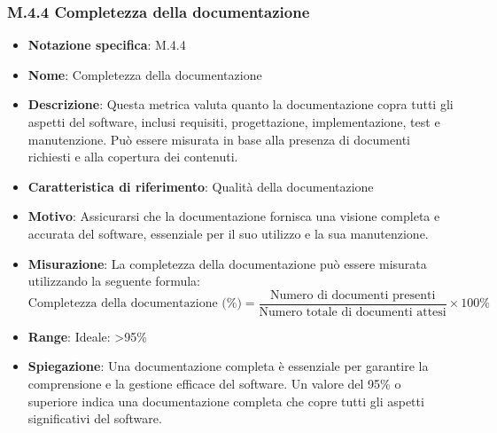 \subsubsection{M.4.4 Completezza della documentazione}
\begin{itemize}
    \item \textbf{Notazione specifica}: M.4.4
    \item \textbf{Nome}: Completezza della documentazione
    \item \textbf{Descrizione}: Questa metrica valuta quanto la documentazione copra tutti gli aspetti del software, inclusi requisiti, progettazione, implementazione, test e manutenzione. Può essere misurata in base alla presenza di documenti richiesti e alla copertura dei contenuti.
    \item \textbf{Caratteristica di riferimento}: Qualità della documentazione
    \item \textbf{Motivo}: Assicurarsi che la documentazione fornisca una visione completa e accurata del software, essenziale per il suo utilizzo e la sua manutenzione.
    \item \textbf{Misurazione}: La completezza della documentazione può essere misurata utilizzando la seguente formula:
    \[ \text{Completezza della documentazione (\%)} = \frac{\text{Numero di documenti presenti}}{\text{Numero totale di documenti attesi}} \times 100\% \]
    \item \textbf{Range}: Ideale: >95\%
    \item \textbf{Spiegazione}: Una documentazione completa è essenziale per garantire la comprensione e la gestione efficace del software. Un valore del 95\% o superiore indica una documentazione completa che copre tutti gli aspetti significativi del software.
\end{itemize}
